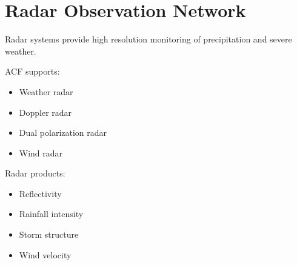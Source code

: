\section{Radar Observation Network}


Radar systems provide high resolution monitoring of
precipitation and severe weather.



ACF supports:


\begin{itemize}

\item Weather radar

\item Doppler radar

\item Dual polarization radar

\item Wind radar

\end{itemize}



Radar products:


\begin{itemize}

\item Reflectivity

\item Rainfall intensity

\item Storm structure

\item Wind velocity

\end{itemize}
